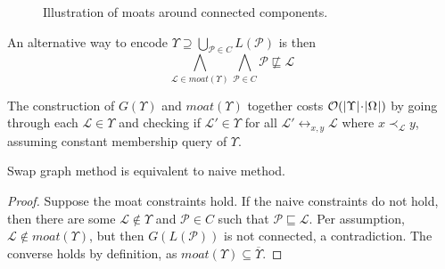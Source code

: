 \documentclass[12pt]{llncs}
\DeclarePairedDelimiter{\abs}{\lvert}{\rvert}
\newcommand{\poset}[1]{\mathcal{#1}}
\newcommand{\uni}[1][]{\Omega_{#1}}
\newcommand{\lang}[1]{L(#1)}
\newcommand{\swap}[1][]{\leftrightarrow_{#1}}
\newcommand{\sgraph}[1]{G(#1)}
\newcommand{\lext}{\sqsubseteq}
\newcommand{\covered}[1][]{\prec_{#1}}
\newcommand{\complmt}[1]{\overline{#1}}
\newcommand{\bigo}[1]{\mathcal{O}(#1)}
\begin{document}
\begin{figure}[H]
    \centering
    \caption{Illustration of moats around connected components.}
    \label{figure:moat}
\end{figure}

An alternative way to encode $\Upsilon \supseteq \bigcup_{\poset{P} \in C} \lang{\poset{P}}$ is then
\[
\bigwedge_{\poset{L} \in moat(\Upsilon)} \bigwedge_{\poset{P} \in C} \poset{P} \not\lext \poset{L}
\]

The construction of $\sgraph{\Upsilon}$ and $moat(\Upsilon)$ together costs $\bigo{\abs{\Upsilon} \!\cdot\! \abs{\uni}}$ by going through each $\poset{L} \!\in\! \Upsilon$ and checking if $\poset{L}' \!\in\! \Upsilon$ for all $\poset{L}' \swap[x,y] \poset{L}$ where $x \covered[\poset{L}] y$, assuming constant membership query of $\Upsilon$.

\begin{proposition}
    Swap graph method is equivalent to naive method.
\end{proposition}
\begin{proof}
    Suppose the moat constraints hold. If the naive constraints do not hold, then there are some $\poset{L} \!\notin\! \Upsilon$ and $\poset{P} \!\in\! C$ such that $\poset{P} \lext \poset{L}$. Per assumption, $\poset{L} \!\notin\! moat(\Upsilon)$, but then $\sgraph{\lang{\poset{P}}}$ is not connected, a contradiction. The converse holds by definition, as $moat(\Upsilon) \subseteq \complmt{\Upsilon}$.
\end{proof}
\end{document}

